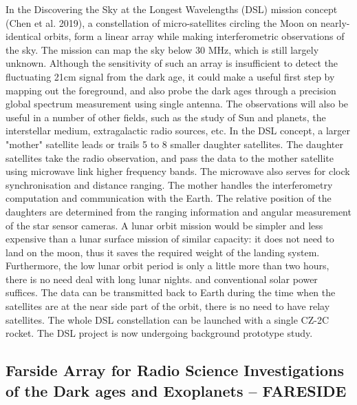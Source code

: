 In the Discovering the Sky at the Longest Wavelengths (DSL) mission concept (Chen et al. 2019), a constellation of micro-satellites circling the Moon on nearly-identical orbits, form a linear array while making interferometric observations of the sky. The mission can map the sky below 30 MHz, which is still largely unknown. Although the sensitivity of such an array is insufficient to detect the fluctuating 21cm signal from the dark age, it could make a useful first step by mapping out the foreground, and also probe the dark ages through a precision global spectrum measurement using single antenna. The observations will also be useful in a number of other fields, such as the study of Sun and planets, the interstellar medium, extragalactic radio sources, etc. In the DSL concept, a larger "mother" satellite leads or trails 5 to 8 smaller daughter satellites. The daughter satellites take the radio observation, and pass the data to the mother satellite using microwave link higher frequency bands. The microwave also serves for clock synchronisation and distance ranging. The mother handles the interferometry computation and communication with the Earth. The relative position of the daughters are determined from the ranging information and angular measurement of the star sensor cameras. A lunar orbit mission would be simpler and less expensive than a lunar surface mission of similar capacity: it does not need to land on the moon, thus it saves the required weight of the landing system. Furthermore, the low lunar orbit period is only a little more than two hours, there is no need deal with long lunar nights. and conventional solar power suffices. The data can be transmitted back to Earth during the time when the satellites are at the near side part of the orbit, there is no need to have relay satellites. The whole DSL constellation can be launched with a single CZ-2C rocket. The DSL project is now undergoing background prototype study.




\subsection{Farside Array for Radio Science Investigations of the Dark ages and Exoplanets -- FARESIDE}

